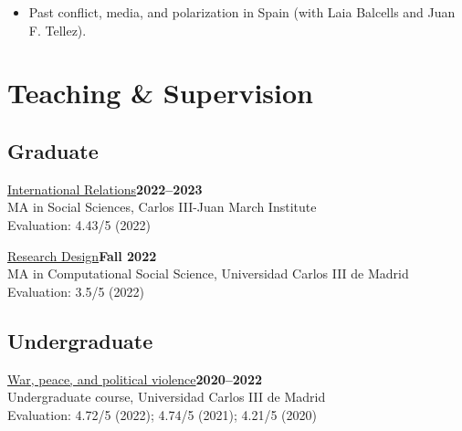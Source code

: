 \documentclass[a4paper, 12pt]{article}
\begin{document}
\begin{itemize}[leftmargin=*, nolistsep]
\item Past conflict, media, and polarization in Spain (with Laia Balcells and Juan F. Tellez).
\end{itemize}

\section*{Teaching \& Supervision}


\subsection*{Graduate}

\noindent
\href{https://github.com/franvillamil/syllabi/blob/master/current/syllabus_IR.pdf}{International Relations}\hfill\textbf{2022--2023}\\
{\small MA in Social Sciences, Carlos III-Juan March Institute}\\
{\small Evaluation: 4.43/5 (2022)}
\vspace{10pt}

\noindent
\href{https://github.com/franvillamil/syllabi/blob/master/current/syllabus_research_design.pdf}{Research Design}\hfill\textbf{Fall 2022}\\
{\small MA in Computational Social Science, Universidad Carlos III de Madrid}\\
{\small Evaluation: 3.5/5 (2022)}

\vspace{-10pt}
\subsection*{Undergraduate}

\noindent
\href{https://github.com/franvillamil/syllabi/blob/master/current/syllabus_war_peace_political_violence.pdf}{War, peace, and political violence}\hfill\textbf{2020--2022}\\
{\small Undergraduate course, Universidad Carlos III de Madrid}\\
{\small Evaluation: 4.72/5 (2022); 4.74/5 (2021); 4.21/5 (2020)}
\vspace{10pt}
\end{document}
